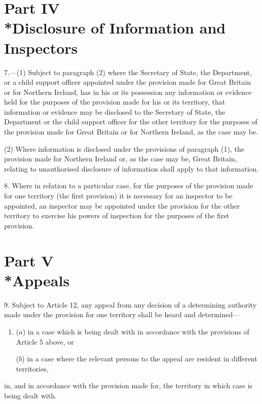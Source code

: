 \documentclass[a4paper]{article}
\newcommand{\parthead}{}
\begin{document}
\section[Part IV --- Disclosure of Information and Inspectors]{Part IV\\*Disclosure of Information and Inspectors}

\renewcommand\parthead{--- Schedule 1 Part IV}

7.—(1) Subject to paragraph (2) where the Secretary of State, the Department, or a child support officer appointed under the provision made for Great Britain or for Northern Ireland, has in his or its possession any information or evidence held for the purposes of the provision made for his or its territory, that information or evidence may be disclosed to the Secretary of State, the Department or the child support officer for the other territory for the purposes of the provision made for Great Britain or for Northern Ireland, as the case may be.

(2) Where information is disclosed under the provisions of paragraph (1), the provision made for Northern Ireland or, as the case may be, Great Britain, relating to unauthorised disclosure of information shall apply to that information.

\medskip

8.  Where in relation to a particular case, for the purposes of the provision made for one territory (the first provision) it is necessary for an inspector to be appointed, an inspector may be appointed under the provision for the other territory to exercise his powers of inspection for the purposes of the first provision.

\section[Part V --- Appeals]{Part V\\*Appeals}

\renewcommand\parthead{--- Schedule 1 Part V}

9.  Subject to Article 12, any appeal from any decision of a determining authority made under the provision for one territory shall be heard and determined—
\begin{enumerate}\item[]
($a$) in a case which is being dealt with in accordance with the provisions of Article 5 above, or

($b$) in a case where the relevant persons to the appeal are resident in different territories,
\end{enumerate}
in, and in accordance with the provision made for, the territory in which case is being dealt with.
\end{document}
